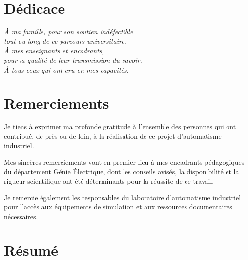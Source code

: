 \documentclass[12pt, a4paper]{report}
\begin{document}
\cleardoublepage

\chapter*{D\'edicace}
\thispagestyle{empty}
\vspace*{4cm}
\begin{flushright}
  \itshape\large
  \`A ma famille, pour son soutien ind\'efectible\\
  tout au long de ce parcours universitaire.\\[1cm]
  \`A mes enseignants et encadrants,\\
  pour la qualit\'e de leur transmission du savoir.\\[1cm]
  \`A tous ceux qui ont cru en mes capacit\'es.
\end{flushright}
\cleardoublepage

\chapter*{Remerciements}

Je tiens \`a exprimer ma profonde gratitude \`a l'ensemble des personnes qui ont contribu\'e,
de pr\`es ou de loin, \`a la r\'ealisation de ce projet d'automatisme industriel.

Mes sinc\`eres remerciements vont en premier lieu \`a mes encadrants p\'edagogiques du
d\'epartement G\'enie \'Electrique, dont les conseils avis\'es, la disponibilit\'e et la rigueur
scientifique ont \'et\'e d\'eterminants pour la r\'eussite de ce travail.

Je remercie \'egalement les responsables du laboratoire d'automatisme industriel pour
l'acc\`es aux \'equipements de simulation et aux ressources documentaires n\'ecessaires.

\cleardoublepage

\chapter*{R\'esum\'e}
\end{document}
